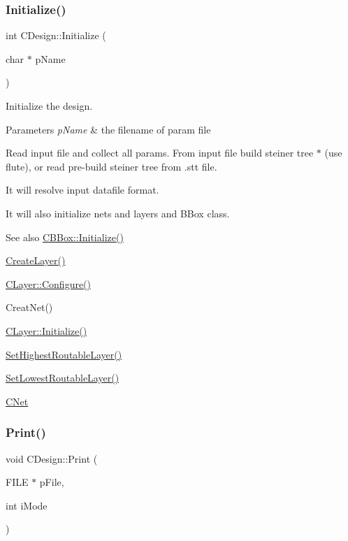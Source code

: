 \subsubsection{\texorpdfstring{Initialize()}{Initialize()}}
{\footnotesize\ttfamily int C\+Design\+::\+Initialize (\begin{DoxyParamCaption}\item[{char $\ast$}]{p\+Name }\end{DoxyParamCaption})\hspace{0.3cm}{\ttfamily [virtual]}}



Initialize the design. 


\begin{DoxyParams}{Parameters}
{\em p\+Name} & the filename of param file\\
\hline
\end{DoxyParams}
Read input file and collect all params. From input file build steiner tree $\ast$ (use flute), or read pre-\/build steiner tree from \textquotesingle{}.stt\textquotesingle{} file.

It will resolve input datafile format.

It will also initialize nets and layers and B\+Box class. \begin{DoxySeeAlso}{See also}
\mbox{\hyperlink{classCBBox_a60eff894d9a143099e91277312a8eb4d}{C\+B\+Box\+::\+Initialize()}}

\mbox{\hyperlink{classCDesign_af116ba8573daa936d633b5ea0b005637}{Create\+Layer()}}

\mbox{\hyperlink{classCLayer_a3d0413e4f025d57639ae6bbd6d34955f}{C\+Layer\+::\+Configure()}}

Creat\+Net()

\mbox{\hyperlink{classCLayer_af987bec19614f92ca98bb9e492aecac0}{C\+Layer\+::\+Initialize()}}

\mbox{\hyperlink{classCDesign_a4dda519df38cb104e804522f76d826fe}{Set\+Highest\+Routable\+Layer()}}

\mbox{\hyperlink{classCDesign_af7d386170d501eb471b63b2f663690b0}{Set\+Lowest\+Routable\+Layer()}}

\mbox{\hyperlink{classCNet}{C\+Net}} 
\end{DoxySeeAlso}
\mbox{\label{classCDesign_ae6f1b5262fb9420660bd768cb7ae613e}} 
\subsubsection{\texorpdfstring{Print()}{Print()}}
{\footnotesize\ttfamily void C\+Design\+::\+Print (\begin{DoxyParamCaption}\item[{F\+I\+LE $\ast$}]{p\+File,  }\item[{int}]{i\+Mode }\end{DoxyParamCaption})\hspace{0.3cm}{\ttfamily [virtual]}}



